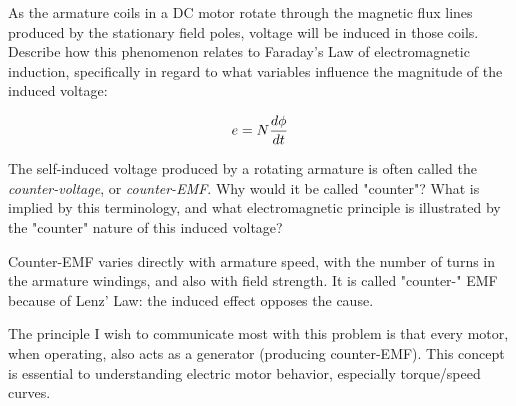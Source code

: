 

As the armature coils in a DC motor rotate through the magnetic flux lines produced by the stationary field poles, voltage will be induced in those coils.  Describe how this phenomenon relates to Faraday's Law of electromagnetic induction, specifically in regard to what variables influence the magnitude of the induced voltage:

$$e = N{d\phi \over dt}$$

The self-induced voltage produced by a rotating armature is often called the {\it counter-voltage}, or {\it counter-EMF}.  Why would it be called "counter"?  What is implied by this terminology, and what electromagnetic principle is illustrated by the "counter" nature of this induced voltage?







Counter-EMF varies directly with armature speed, with the number of turns in the armature windings, and also with field strength.  It is called "counter-" EMF because of Lenz' Law: the induced effect opposes the cause.







The principle I wish to communicate most with this problem is that every motor, when operating, also acts as a generator (producing counter-EMF).  This concept is essential to understanding electric motor behavior, especially torque/speed curves.




